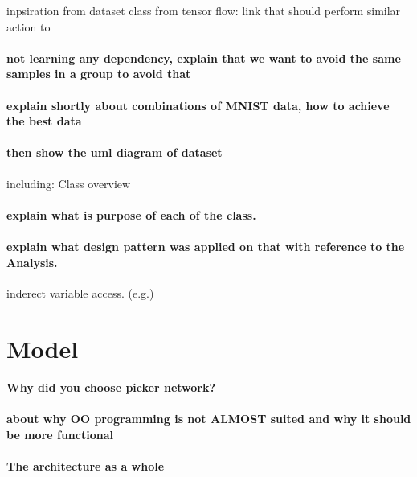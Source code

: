 inpsiration from dataset class from tensor flow: link
that should perform similar action to

\paragraph{
	not learning any dependency,
	explain that we want to avoid the same samples in a group to avoid that
}

\paragraph{
	explain shortly about combinations of MNIST data, how to achieve the best data
}

\paragraph{then show the uml diagram of dataset}
including: Class overview

\paragraph{explain what is purpose of each of the class. }

\paragraph{explain what design pattern was applied on that with reference to
the Analysis.}

inderect variable access. (e.g.)

\section{Model}
\label{sec:design_model}

\paragraph{Why did you choose picker network?}
\paragraph{about why OO programming is not ALMOST suited and why it should be more functional}
\paragraph{The architecture as a whole}
